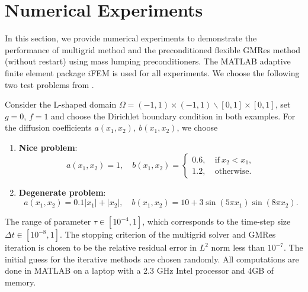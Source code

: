 \documentclass[smallcondensed]{svjour3}
\numberwithin{equation}{section} \numberwithin{table}{section}
\numberwithin{figure}{section}
\numberwithin{algorithm}{section}
\begin{document}
\section{Numerical Experiments}
\label{sec:Numerical experiments}
In this section, we provide numerical experiments to demonstrate the performance of multigrid method and the preconditioned flexible GMRes method (without restart) using mass lumping preconditioners. The MATLAB adaptive finite element package $i$FEM \cite{long2009ifem} is used for all experiments. We choose the following two test problems from \cite{bansch2011preconditioning}. 

Consider the L-shaped domain $\Omega=(-1, 1)\times (-1, 1)\backslash [0, 1]\times [0, 1]$, set $g=0$, $f=1$ and choose the Dirichlet boundary condition in both examples. For the diffusion coefficients $a(x_1, x_2),\ b(x_1, x_2)$, we choose
\begin{enumerate}
\item {\textbf{Nice problem}}: 
$$
a(x_1, x_2)=1,\quad b(x_1, x_2)=\left\{\begin{array} {cc} 0.6,\ & \mbox{if}\ x_2<x_1,\\ 1.2, & \mbox{otherwise}.\end{array}\right.
$$

\item {\textbf{Degenerate problem}}: 
$$
a(x_1, x_2)=0.1|x_1|+|x_2|, \quad b(x_1, x_2)=10+3\sin(5\pi x_1)\sin(8\pi x_2).
$$
\end{enumerate}

The range of parameter $\tau\in [10^{-4}, 1]$, which corresponds to the time-step size $\Delta t\in [10^{-8}, 1]$. The stopping criterion of the multigrid solver and GMRes iteration is chosen to be the relative residual error in $L^2$ norm less than $10^{-7}$. The initial guess for the iterative methods are chosen randomly. All computations are done in MATLAB on a laptop with a 2.3 GHz Intel processor and 4GB of memory.
\end{document}
